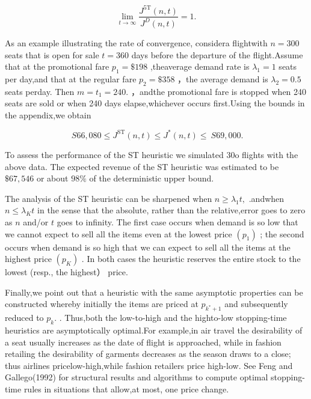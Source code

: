 \[
\operatorname* { l i m } _ { t \to \infty } \frac { J ^ { 5 \mathrm { T } } ( n , t ) } { J ^ { D } ( n , t ) } = 1 .
\]

As an example illustrating the rate of convergence, considera flightwith
\(n = 3 0 0\) seats that is open for sale \(t = 3 6 0\) days before the
departure of the flight.Assume that at the promotional fare
\(p _ { 1 } = \$ 198\) ,theaverage demand rate is
\(\lambda _ { 1 } = 1\) seats per day,and that at the regular fare
\(p _ { 2 } = \$ 358\) ，the average demand is
\(\lambda _ { 2 } = 0 . 5\) seats perday. Then
\(m = t _ { 1 } = 2 4 0 .\) ，andthe promotional fare is stopped when
240 seats are sold or when 240 days elapse,whichever occurs first.Using
the bounds in the appendix,we obtain

\[
\ S 6 6 , 0 8 0 \le J ^ { \mathrm { S T } } ( n , t ) \le J ^ { * } ( n , t ) \le \ S 6 9 , 0 0 0 .
\]

To assess the performance of the ST heuristic we simulated 30o flights
with the above data. The expected revenue of the ST heuristic was
estimated to be \(\$ 67,546\) or about \(9 8 \%\) of the deterministic
upper bound.

The analysis of the ST heuristic can be sharpened when
\(n \geq \lambda _ { 1 } t ,\) .andwhen \(n \leq \lambda _ { K } t\) in
the sense that the absolute, rather than the relative,error goes to zero
as \(n\) and/or \(t\) goes to infinity. The first case occurs when
demand is so low that we cannot expect to sell all the items even at the
lowest price \(\left( { { p } _ { 1 } } \right)\) ; the second occurs
when demand is so high that we can expect to sell all the items at the
highest price \(\left( { p } _ { K } \right)\) . In both cases the
heuristic reserves the entire stock to the lowest (resp., the highest）
price.

Finally,we point out that a heuristic with the same asymptotic
properties can be constructed whereby initially the items are priced at
\(p _ { k ^ { * } + 1 }\) and subsequently reduced to \(p _ { k } .\) .
Thus,both the low-to-high and the highto-low stopping-time heuristics
are asymptotically optimal.For example,in air travel the desirability of
a seat usually increases as the date of flight is approached, while in
fashion retailing the desirability of garments decreases as the season
draws to a close; thus airlines pricelow-high,while fashion retailers
price high-low. See Feng and Gallego(1992) for structural results and
algorithms to compute optimal stopping-time rules in situations that
allow,at most, one price change.

